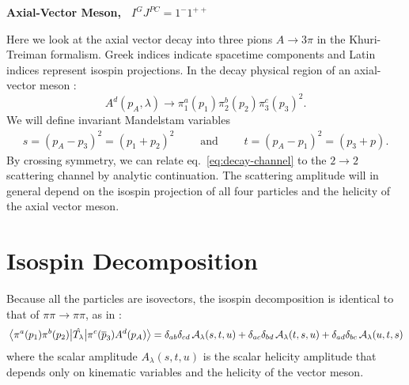 \documentclass[10pt, aps,prd,amsmath,amssymb,superscriptaddress,onecolumn,
nofootinbib,showpacs,preprintnumbers]{revtex4-1}
\begin{document}
\begin{center}
\large \textbf{Axial-Vector Meson, \, \(I^G J^{PC} = 1^-1^{++}\)}
\end{center}

Here we look at the axial vector decay into three pions \(A \to 3\pi\) in the Khuri-Treiman formalism. Greek indices indicate spacetime components and Latin indices represent isospin projections.
In the decay physical region of an axial-vector meson :
  \begin{equation}
    \label{eq:decay-channel}
    A^d(p_A, \lambda) \rightarrow \pi_1^a(p_1) \pi_2^b(p_2) \pi^c_3(p_3)^2.
  \end{equation}
We will define invariant Mandelstam variables
  \begin{align}
    s = (p_A - p_3)^2 = (p_1 + p_2)^2 \qquad \text{ and } \qquad t = (p_A - p_1)^2 = (p_3 + p).
  \end{align}
By crossing symmetry, we can relate eq.~\ref{eq:decay-channel} to the \(2\to2\) scattering channel by analytic continuation. The scattering amplitude will in general depend on the isospin projection of all four particles and the helicity of the axial vector meson.
\section{Isospin Decomposition}
Because all the particles are isovectors, the isospin decomposition is identical to that of \(\pi\pi\to\pi\pi\), as in \cite{Albaladejo2018}:
  \begin{equation}
    \label{eq:scalar-decomp}
    \mel{\pi^a(p_1)\pi^b(p_2)}{\hat{T_\lambda}}{\pi^c(\overline{p}_3)A^d(p_A)} = \delta_{ab}\delta_{cd} \, \mathcal{A}_\lambda(s,t,u) + \delta_{ac}\delta_{bd} \, \mathcal{A}_\lambda(t,s,u) + \delta_{ad}\delta_{bc} \, \mathcal{A}_\lambda(u,t,s)
  \end{equation}
where the scalar amplitude \(A_\lambda(s,t,u)\) is the scalar helicity amplitude that depends only on kinematic variables and the helicity of the vector meson.
\end{document}
